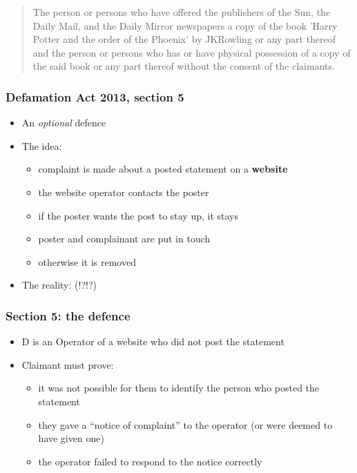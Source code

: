 \documentclass[ignorenonframetext,]{beamer}
\begin{document}
\begin{frame}
  \begin{quote}
     The person or persons who have offered the publishers of the Sun, the Daily Mail, and the Daily Mirror newspapers a copy of the book 'Harry Potter and the order of the Phoenix' by JKRowling or any part thereof and the person or persons who has or have physical possession of a copy of the said book or any part thereof without the consent of the claimants.
  \end{quote}
\end{frame}

\begin{frame}
  \frametitle{Defamation Act 2013, section 5}
  \begin{itemize}
  \item An {\it optional} defence
  \item The idea:
    \begin{itemize}
    \item complaint is made about a posted statement on a {\bf website}
    \item the website operator contacts the poster
    \item if the poster wants the post to stay up, it stays
    \item poster and complainant are put in touch
    \item otherwise it is removed
    \end{itemize}
  \item The reality: (!?!?)
  \end{itemize}
\end{frame}

\begin{frame}
  \frametitle{Section 5: the defence}
  \begin{itemize}
  \item D is an Operator of a website who did not post the statement
  \item Claimant must prove:
    \begin{itemize}
    \item it was not possible for them to identify the person who posted the statement
    \item they gave a ``notice of complaint'' to the operator (or were deemed to have given one)
    \item the operator failed to respond to the notice correctly
    \end{itemize}
  \end{itemize}
\end{frame}
\end{document}
